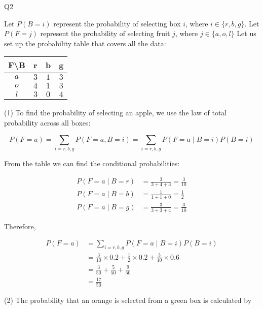 \question Q2\droppoints

\begin{solution}
    Let $P(B = i)$ represent the probability of selecting box $i$, where $i \in \{ r, b, g\}$.
    Let $P(F = j)$ represent the probability of selecting fruit $j$, where $j \in \{ a, o, l \}$
    Let us set up the probability table that covers all the data:

    \vspace{1em}
    \centering
    \begin{tabular}{ c | c c c }
        \hline
        F\textbackslash B & r   & b   & g   \\
        \hline
        $a$               & $3$ & $1$ & $3$ \\
        $o$               & $4$ & $1$ & $3$ \\
        $l$               & $3$ & $0$ & $4$ \\
        \hline
    \end{tabular}
    \vspace{1em}

    \raggedright
    (1) To find the probability of selecting an apple, we use the law of total probability across all boxes:

    \[
        P(F = a) = \sum_{i = r, b, g}{P(F = a, B = i)} = \sum_{i = r, b, g}{P(F = a \mid B = i)P(B = i)}
    \]

    From the table we can find the conditional probabilities:

    \begin{align*}
        P(F = a \mid B = r) &= \frac{3}{3 + 4 + 3} = \frac{3}{10} \\
        P(F = a \mid B = b) &= \frac{1}{1 + 1 + 0} = \frac{1}{2} \\
        P(F = a \mid B = g) &= \frac{3}{3 + 3 + 4} = \frac{3}{10}
    \end{align*}

    Therefore,

    \begin{align*}
        P(F = a)
        &= \sum_{i = r, b, g}{P(F = a \mid B = i)P(B = i)} \\
        &= \frac{3}{10} \times 0.2 + \frac{1}{2} \times 0.2 + \frac{3}{10} \times 0.6 \\
        &= \frac{3}{50} + \frac{5}{50} + \frac{9}{50} \\
        &= \frac{17}{50}
    \end{align*}

    (2) The probability that an orange is selected from a green box is calculated by


\end{solution}
